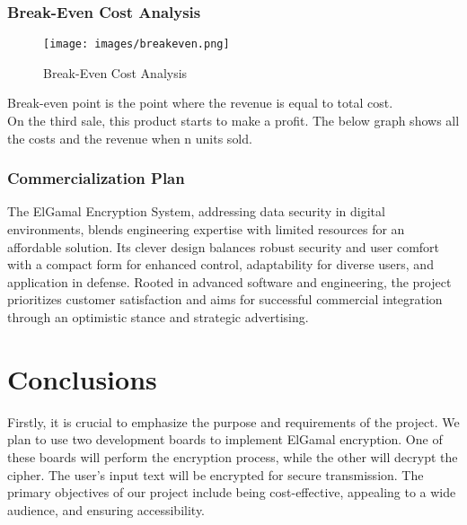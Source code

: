 \documentclass[12pt]{article}
\begin{document}
	\subsubsection*{Break-Even Cost Analysis}
	\begin{multicols}{2}
	\begin{figure}[H]

		\label{Level22 Design Of The System}
		\texttt{[image: images/breakeven.png]}	
		\caption{Break-Even Cost Analysis} 		
	\end{figure}
{\scriptsize
 Break-even point is the point where the revenue is equal to total cost.\\
On the third sale, this product starts to make a profit. The below graph shows all the costs and the revenue when n units sold.}

 
\end{multicols}
	\subsubsection*{Commercialization Plan }
	The ElGamal Encryption System, addressing data security in digital environments, blends engineering expertise with limited resources for an affordable solution. Its clever design balances robust security and user comfort with a compact form for enhanced control, adaptability for diverse users, and application in defense. Rooted in advanced software and engineering, the project prioritizes customer satisfaction and aims for successful commercial integration through an optimistic stance and strategic advertising.
	\newpage
	\section{Conclusions}
	
	Firstly, it is crucial to emphasize the purpose and requirements of the project. We plan to use two development boards to implement ElGamal encryption. One of these boards will perform the encryption process, while the other will decrypt the cipher. The user's input text will be encrypted for secure transmission. The primary objectives of our project include being cost-effective, appealing to a wide audience, and ensuring accessibility.\cite{koblitz2012course}
	
\end{document}
